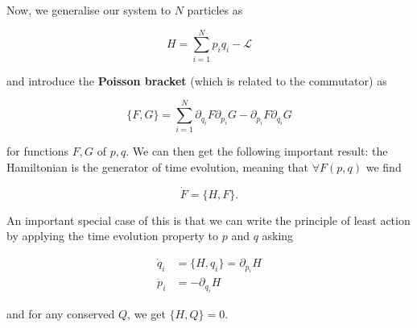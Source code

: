 \documentclass{article}
\theoremstyle{definition}
\begin{document}
Now, we generalise our system to $N$ particles as

$$ H = \sum_{i=1}^N p_i q_i - \mathcal{L} $$

and introduce the \textbf{Poisson
  bracket} (which is related to the commutator) as 

$$ \{F, G\} = \sum_{i = 1}^N \partial_{q_i} F \partial_{p_i} G - \partial_{p_i}
F \partial_{q_i} G $$

for functions $F, G$ of $p, q$. We can then get the following important result:
the Hamiltonian is the generator of time evolution, meaning that $\forall F(p,
q)$ we find

$$ \dot{F} = \{H, F\}. $$

An important special case of this is that we can write the principle of least
action by applying the time evolution property to $p$ and $q$ asking

\begin{align*}
  \dot{q}_i &= \{H, q_i\} = \partial_{p_i} H \\
\dot{p}_i &= -\partial_{q_i} H
\end{align*}

and for any conserved $Q$, we get $\{H, Q\} = 0$.
\end{document}
